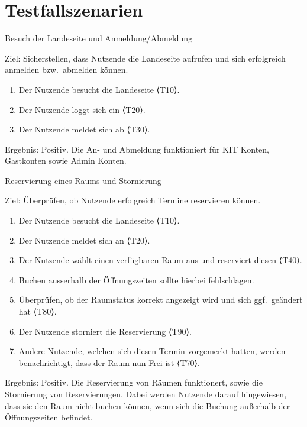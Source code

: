 \section{Testfallszenarien}\label{sec:testfallszenarien}
\begin{scenario}{10}{Besuch der Landeseite und Anmeldung/Abmeldung}
    \item[Ziel:] Sicherstellen, dass Nutzende die Landeseite aufrufen und sich erfolgreich anmelden bzw.\ abmelden können.
    \begin{enumerate}
        \item Der Nutzende besucht die Landeseite ⟨T10⟩.
        \item Der Nutzende loggt sich ein ⟨T20⟩.
        \item Der Nutzende meldet sich ab ⟨T30⟩.
    \end{enumerate}
    \item[Ergebnis:] Positiv.
    Die An- und Abmeldung funktioniert für KIT Konten, Gastkonten sowie Admin Konten.
\end{scenario}

\begin{scenario}{20}{Reservierung eines Raums und Stornierung}
    \item[Ziel:] Überprüfen, ob Nutzende erfolgreich Termine reservieren können.
    \begin{enumerate}
        \item Der Nutzende besucht die Landeseite ⟨T10⟩.
        \item Der Nutzende meldet sich an ⟨T20⟩.
        \item Der Nutzende wählt einen verfügbaren Raum aus und reserviert diesen ⟨T40⟩.
        \item Buchen ausserhalb der Öffnungszeiten sollte hierbei fehlschlagen.
        \item Überprüfen, ob der Raumstatus korrekt angezeigt wird und sich ggf.\ geändert hat ⟨T80⟩.
        \item Der Nutzende storniert die Reservierung ⟨T90⟩.
        \item Andere Nutzende, welchen sich diesen Termin vorgemerkt hatten, werden benachrichtigt, dass der Raum nun Frei ist ⟨T70⟩.
    \end{enumerate}
    \item[Ergebnis:] Positiv.
    Die Reservierung von Räumen funktionert, sowie die Stornierung von Reservierungen.
    Dabei werden Nutzende darauf hingewiesen, dass sie den Raum nicht buchen können, wenn sich die Buchung außerhalb der Öffnungszeiten befindet.
\end{scenario}

